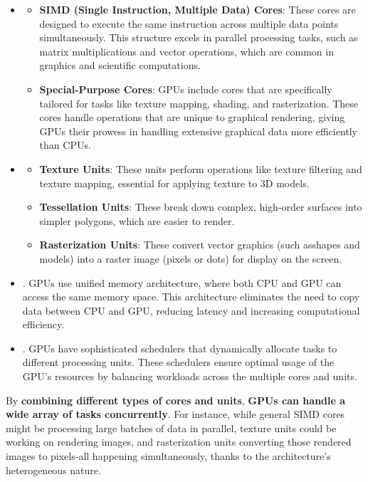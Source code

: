 \begin{itemize}
    \item {}
    \begin{itemize}
        \item \textbf{SIMD (Single Instruction, Multiple Data) Cores}: These cores are designed to execute the same instruction across multiple data points simultaneously. This structure excels in parallel processing tasks, such as matrix multiplications and vector operations, which are common in graphics and scientific computations.
        \item \textbf{Special-Purpose Cores}: GPUs include cores that are specifically tailored for tasks like texture mapping, shading, and rasterization. These cores handle operations that are unique to graphical rendering, giving GPUs their prowess in handling extensive graphical data more efficiently than CPUs.
    \end{itemize}

    \item {}
    \begin{itemize}
        \item \textbf{Texture Units}: These units perform operations like texture filtering and texture mapping, essential for applying texture to 3D models.
        \item \textbf{Tessellation Units}: These break down complex, high-order surfaces into simpler polygons, which are easier to render.
        \item \textbf{Rasterization Units}: These convert vector graphics (such as\break shapes and models) into a raster image (pixels or dots) for display on the screen.
    \end{itemize}

    \item {}. GPUs use unified memory architecture, where both CPU and GPU can access the same memory space. This architecture eliminates the need to copy data between CPU and GPU, reducing latency and increasing computational efficiency.

    \item {}. GPUs have sophisticated schedulers that dynamically allocate tasks to different processing units. These schedulers ensure optimal usage of the GPU's resources by balancing workloads across the multiple cores and units.
\end{itemize}
By \textbf{combining different types of cores and units}, \textbf{GPUs can handle a wide array of tasks concurrently}. For instance, while general SIMD cores might be processing large batches of data in parallel, texture units could be working on rendering images, and rasterization units converting those rendered images to pixels-all happening simultaneously, thanks to the architecture's heterogeneous nature.

